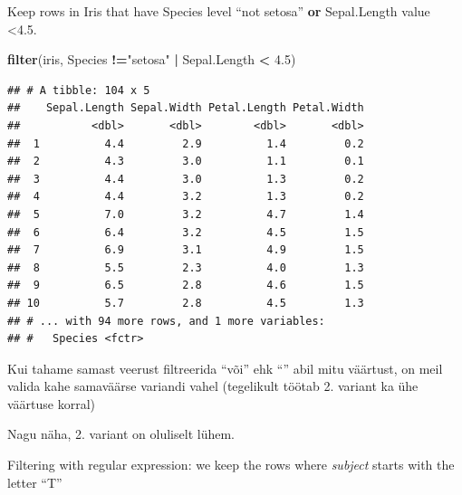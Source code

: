 \documentclass[]{book}
\newenvironment{Shaded}{\begin{snugshade}}{\end{snugshade}}
\newcommand{\KeywordTok}[1]{\textcolor[rgb]{0.13,0.29,0.53}{\textbf{#1}}}
\newcommand{\FloatTok}[1]{\textcolor[rgb]{0.00,0.00,0.81}{#1}}
\newcommand{\StringTok}[1]{\textcolor[rgb]{0.31,0.60,0.02}{#1}}
\newcommand{\OperatorTok}[1]{\textcolor[rgb]{0.81,0.36,0.00}{\textbf{#1}}}
\newcommand{\NormalTok}[1]{#1}
\begin{document}
Keep rows in Iris that have Species level ``not setosa'' \textbf{or}
Sepal.Length value \textless{}4.5.

\begin{Shaded}
\begin{Highlighting}[]
\KeywordTok{filter}\NormalTok{(iris, Species }\OperatorTok{!=}\StringTok{"setosa"} \OperatorTok{|}\StringTok{ }\NormalTok{Sepal.Length }\OperatorTok{<}\StringTok{ }\FloatTok{4.5}\NormalTok{)}
\end{Highlighting}
\end{Shaded}

\begin{verbatim}
## # A tibble: 104 x 5
##    Sepal.Length Sepal.Width Petal.Length Petal.Width
##           <dbl>       <dbl>        <dbl>       <dbl>
##  1          4.4         2.9          1.4         0.2
##  2          4.3         3.0          1.1         0.1
##  3          4.4         3.0          1.3         0.2
##  4          4.4         3.2          1.3         0.2
##  5          7.0         3.2          4.7         1.4
##  6          6.4         3.2          4.5         1.5
##  7          6.9         3.1          4.9         1.5
##  8          5.5         2.3          4.0         1.3
##  9          6.5         2.8          4.6         1.5
## 10          5.7         2.8          4.5         1.3
## # ... with 94 more rows, and 1 more variables:
## #   Species <fctr>
\end{verbatim}

Kui tahame samast veerust filtreerida ``või'' ehk ``\textbar{}'' abil
mitu väärtust, on meil valida kahe samaväärse variandi vahel (tegelikult
töötab 2. variant ka ühe väärtuse korral)

\begin{Shaded}
\end{Shaded}

Nagu näha, 2. variant on oluliselt lühem.

Filtering with regular expression: we keep the rows where \emph{subject}
starts with the letter ``T''
\end{document}
